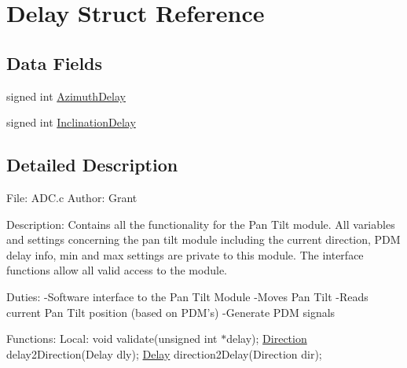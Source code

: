 \hypertarget{struct_delay}{\section{Delay Struct Reference}
\label{struct_delay}
}
\subsection*{Data Fields}
\begin{DoxyCompactItemize}
\item 
signed int \hyperlink{struct_delay_aacc83952fc6c5812597bc96d622f5317}{Azimuth\+Delay}
\item 
signed int \hyperlink{struct_delay_a4f5b10a6a07a4aaed02134ab2691b8ec}{Inclination\+Delay}
\end{DoxyCompactItemize}


\subsection{Detailed Description}


 File\+: A\+D\+C.\+c Author\+: Grant

Description\+: Contains all the functionality for the Pan Tilt module. All variables and settings concerning the pan tilt module including the current direction, P\+D\+M delay info, min and max settings are private to this module. The interface functions allow all valid access to the module.

Duties\+: -\/\+Software interface to the Pan Tilt Module -\/\+Moves Pan Tilt -\/\+Reads current Pan Tilt position (based on P\+D\+M's) -\/\+Generate P\+D\+M signals

Functions\+: Local\+: void validate(unsigned int $\ast$delay); \hyperlink{struct_direction}{Direction} delay2\+Direction(\+Delay dly); \hyperlink{struct_delay}{Delay} direction2\+Delay(\+Direction dir);

